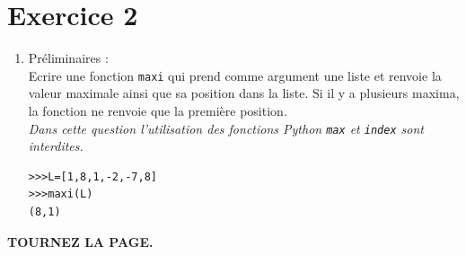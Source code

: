 






\section*{Exercice 2}
\begin{enumerate}
\item Préliminaires :\\
Ecrire une fonction \verb?maxi? qui prend comme argument une liste et renvoie la valeur maximale ainsi que sa position dans la liste. Si il y a plusieurs maxima, la fonction ne renvoie que la première position.\\
\textit{Dans cette question l'utilisation des fonctions Python \verb?max? et \verb?index? sont interdites.}
\begin{verbatim}
>>>L=[1,8,1,-2,-7,8]
>>>maxi(L)
(8,1)
\end{verbatim}
\end{enumerate}


\vfill {\Large\textbf{TOURNEZ LA PAGE.}}
\newpage



